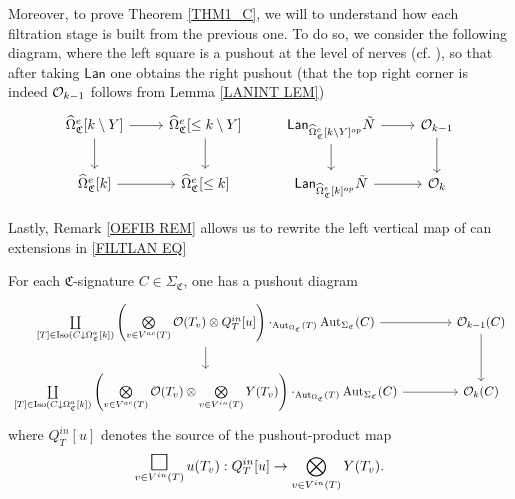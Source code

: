 \documentclass[a4paper,10pt
,draft
]{article}%
\renewcommand{\1}{\eta}%
\newcommand{\SC}{\Sigma_{\mathfrak C}}
\newcommand{\OC}{\Omega_{\mathfrak C}}
\begin{document}
Moreover, to prove Theorem \ref{THM1_C}, we will to
understand how each filtration stage is built from the previous one.
To do so, we consider the following diagram, where the left square is a pushout at the level of nerves (cf. \cite[(5.65)]{BP_geo}),
so that after taking $\mathsf{Lan}$
one obtains the right pushout
(that the top right corner is indeed $\mathcal{O}_{k-1}$ follows from Lemma \ref{LANINT LEM})
\begin{equation}\label{FILTLAN EQ}
\begin{tikzcd}
		\widehat\Omega_{\mathfrak C}^e[k \setminus Y] \arrow[r] \arrow[d]
	&
		\widehat\Omega_{\mathfrak C}^e[\leq k \setminus Y] \arrow[d]
&
		\mathsf{Lan}_{\widehat\Omega_{\mathfrak C}^e[k \setminus Y]^{op}} \tilde N \arrow[r] \arrow[d]
	&
		\O_{k-1} \arrow[d]
\\
		\widehat\Omega_{\mathfrak C}^e[k] \arrow[r]
	&
		\widehat\Omega_{\mathfrak C}^e[\leq k]
&
		\mathsf{Lan}_{\widehat \Omega_{\mathfrak C}^e[k]^{op}} \tilde N \arrow[r]
	&
		\O_k
\end{tikzcd}
\end{equation}


Lastly, Remark \ref{OEFIB REM} allows us to 
rewrite the left vertical map of can extensions in \eqref{FILTLAN EQ}


\begin{proposition}
      \label{FILTPUSH PROP}
For each $\mathfrak C$-signature $C \in \Sigma_{\mathfrak C}$, one has a pushout diagram
      \vspace{-10pt}
\begin{align}\label{FILTPUSH EQ}
\begin{tikzcd}[ampersand replacement=\&]
	\mathop{\coprod}\limits_{[T] \in \Iso(C \downarrow \Omega_{\mathfrak C}^a[k])}
	\left(
		\mathop{\bigotimes}\limits_{v \in V^{ac}(T)} \O(T_v) \otimes
		Q^{in}_T[u]
	\right) \cdot_{\Aut_{\OC} (T)} \Aut_{\SC}(C)
		\arrow[r] \arrow[d]
\&[15pt]
	\O_{k-1}(C) \arrow[d]
\\                  
	\mathop{\coprod}\limits_{[T] \in \Iso(C \downarrow \Omega_{\mathfrak C}^a[k])}
	\left(
		\mathop{\bigotimes}\limits_{v \in V^{ac}(T)} \O(T_v) \otimes
		\mathop{\bigotimes}\limits_{v \in V^{in}(T)} Y(T_v)
	\right) \cdot_{\Aut_{\OC}(T)} \Aut_{\SC}(C)
		\arrow[r]
\&
\O_k(C)
\end{tikzcd}
\end{align}
      where $Q^{in}_T[u]$ denotes the source of the pushout-product map
      \begin{equation}
            \mathop{\mathlarger{\mathlarger{\mathlarger{\square}}}}_{v \in V^{in}(T)} u(T_v): Q^{in}_T[u] \to \bigotimes_{v \in V^{in}(T)} Y(T_v).
      \end{equation}
\end{proposition}
\end{document}
